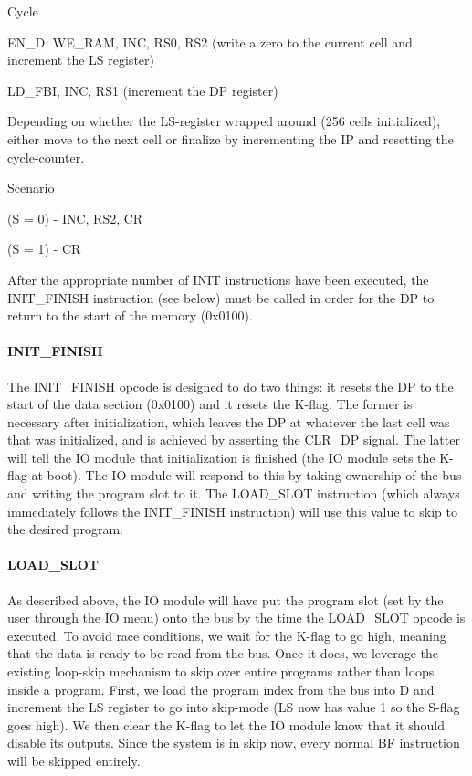 \begin{labeledenum}{Cycle}
\item EN\_D, WE\_RAM, INC, RS0, RS2 (write a zero to the current cell and increment the LS register)
\item LD\_FBI, INC, RS1 (increment the DP register)
\item Depending on whether the LS-register wrapped around (256 cells initialized), either move to the next cell or finalize by incrementing the IP and resetting the cycle-counter.

  \begin{labeledenum}{Scenario}
  \item (S = 0) - INC, RS2, CR
  \item (S = 1) - CR
  \end{labeledenum}

\end{labeledenum}
After the appropriate number of INIT instructions have been executed, the INIT\_FINISH instruction (see below) must be called in order for the DP to return to the start of the memory (0x0100).

\paragraph{INIT\_FINISH}
The INIT\_FINISH opcode is designed to do two things: it resets the DP to the start of the data section (0x0100) and it resets the K-flag. The former is necessary after initialization, which leaves the DP at whatever the last cell was that was initialized, and is achieved by asserting the CLR\_DP signal. The latter will tell the IO module that initialization is finished (the IO module sets the K-flag at boot). The IO module will respond to this by taking ownership of the bus and writing the program slot to it. The LOAD\_SLOT instruction (which always immediately follows the INIT\_FINISH instruction) will use this value to skip to the desired program.

\paragraph{LOAD\_SLOT}
As described above, the IO module will have put the program slot (set by the user through the IO menu) onto the bus by the time the LOAD\_SLOT opcode is executed. To avoid race conditions, we wait for the K-flag to go high, meaning that the data is ready to be read from the bus. Once it does, we leverage the existing loop-skip mechanism to skip over entire programs rather than loops inside a program. First, we load the program index from the bus into D and increment the LS register to go into skip-mode (LS now has value 1 so the S-flag goes high). We then clear the K-flag to let the IO module know that it should disable its outputs. Since the system is in skip now, every normal BF instruction will be skipped entirely.

